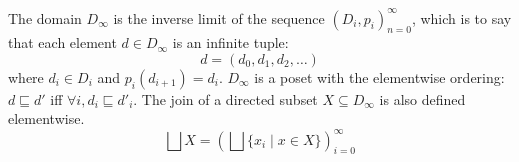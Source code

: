 \documentclass{tufte-handout}
\begin{document}










The domain $D_{\infty}$ is the inverse limit of the sequence
$(D_i,p_i)_{n=0}^\infty$, which is to say that each element 
$d \in D_{\infty}$ is an infinite tuple:
\[
   d=(d_0,d_1, d_2, \ldots )
\]
where $d_i \in D_i$ and $p_i(d_{i+1}) = d_i$.  $D_\infty$ is a poset
with the elementwise ordering: $d \sqsubseteq d'$ iff $\forall i, d_i
\sqsubseteq d'_i$.  The join of a directed subset $X \subseteq
D_\infty$ is also defined elementwise.
\[
   \bigsqcup X = \left( \bigsqcup \{ x_i \mid x \in X \} \right)^\infty_{i=0}
\]
\end{document}

